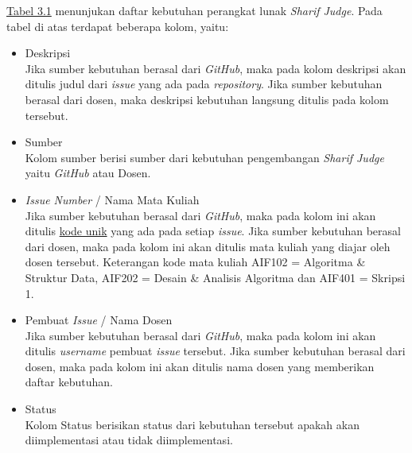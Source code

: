 \hyperref[tab:kebutuhan]{Tabel 3.1} menunjukan daftar kebutuhan perangkat lunak \textit{Sharif Judge}. Pada tabel di atas terdapat beberapa kolom, yaitu:
\begin{itemize}
	\item Deskripsi \\
	Jika sumber kebutuhan berasal dari \textit{GitHub}, maka pada kolom deskripsi akan ditulis judul dari \textit{issue} yang ada pada \textit{repository}. Jika sumber kebutuhan berasal dari dosen, maka deskripsi kebutuhan langsung ditulis pada kolom tersebut.
	\item Sumber \\
	Kolom sumber berisi sumber dari kebutuhan pengembangan \textit{Sharif Judge} yaitu \textit{GitHub} atau Dosen.
	\item \textit{Issue Number} / Nama Mata Kuliah \\
	Jika sumber kebutuhan berasal dari \textit{GitHub}, maka pada kolom ini akan ditulis \hyperref[sec:analisis]{kode unik} yang ada pada setiap \textit{issue}. Jika sumber kebutuhan berasal dari dosen, maka pada kolom ini akan ditulis mata kuliah yang diajar oleh dosen tersebut. Keterangan kode mata kuliah AIF102 = Algoritma \& Struktur Data, AIF202 = Desain \& Analisis Algoritma dan AIF401 = Skripsi 1.
	\item Pembuat \textit{Issue} / Nama Dosen \\
	Jika sumber kebutuhan berasal dari \textit{GitHub}, maka pada kolom ini akan ditulis \textit{username} pembuat \textit{issue} tersebut. Jika sumber kebutuhan berasal dari dosen, maka pada kolom ini akan ditulis nama dosen yang memberikan daftar kebutuhan.
	\item Status \\
	Kolom Status berisikan status dari kebutuhan tersebut apakah akan diimplementasi atau tidak diimplementasi.
\end{itemize}


